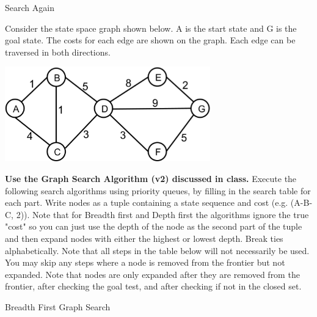 
\begin{problem}{Search Again}

Consider the state space graph shown below.  A is the start state and
G is the goal state. The costs for each edge are shown on the graph.
Each edge can be traversed in both directions.

\begin{center}
\includegraphics[width=3.5in]{figures/search_graph.eps}
\end{center}

\textbf{Use the Graph Search Algorithm (v2) discussed in class.}
Execute the following search algorithms using priority queues, by
filling in the search table for each part. Write nodes as a tuple containing a state sequence and cost (e.g. (A-B-C, 2)). Note that for Breadth first and Depth first the algorithms ignore the true "cost" so you can just use the depth of the node as the second part of the tuple and then expand nodes with either the highest or lowest depth. Break ties alphabetically.  Note that all steps in the table below will not
necessarily be used. You may skip any steps where a node is removed from the frontier but not expanded. Note that nodes are only expanded after they are removed from the frontier, after checking the goal test, and after checking if not in the closed set.

    
\begin{question}[3]
Breadth First Graph Search


\end{question}
\end{problem}
